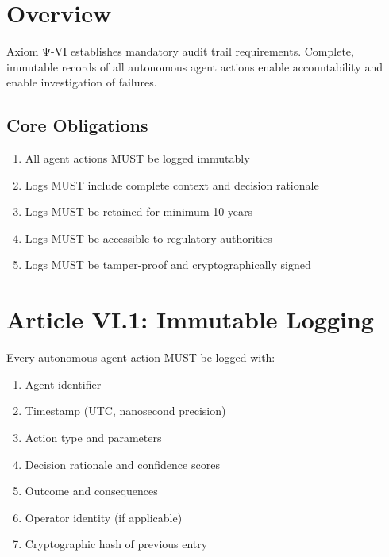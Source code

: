 \vspace{0.5cm}

\section{Overview}

Axiom Ψ-VI establishes mandatory audit trail requirements. Complete, immutable records of all autonomous agent actions enable accountability and enable investigation of failures.

\subsection{Core Obligations}

\begin{enumerate}
    \item All agent actions MUST be logged immutably
    \item Logs MUST include complete context and decision rationale
    \item Logs MUST be retained for minimum 10 years
    \item Logs MUST be accessible to regulatory authorities
    \item Logs MUST be tamper-proof and cryptographically signed
\end{enumerate}

\vspace{0.5cm}

\section{Article VI.1: Immutable Logging}

\begin{articlebox}
Every autonomous agent action MUST be logged with:
\begin{enumerate}
    \item Agent identifier
    \item Timestamp (UTC, nanosecond precision)
    \item Action type and parameters
    \item Decision rationale and confidence scores
    \item Outcome and consequences
    \item Operator identity (if applicable)
    \item Cryptographic hash of previous entry
\end{enumerate}
\end{articlebox}

